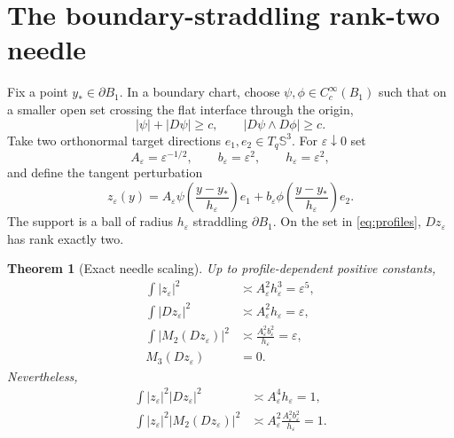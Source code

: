 \documentclass[10pt]{article}
\newtheorem{theorem}{Theorem}[section]
\newcommand{\SSS}{\mathbb S}
\begin{document}
\section{The boundary-straddling rank-two needle}

Fix a point $y_\ast\in\partial B_1$.  In a boundary chart, choose
$\psi,\phi\in C_c^\infty(B_1)$ such that on a smaller open set crossing the
flat interface through the origin,
\begin{equation}
 |\psi|+|D\psi|\geq c,\qquad |D\psi\wedge D\phi|\geq c. \label{eq:profiles}
\end{equation}
Take two orthonormal target directions $e_1,e_2\in T_q\SSS^3$.  For
$\varepsilon\downarrow0$ set
\begin{equation}
 A_\varepsilon=\varepsilon^{-1/2},\qquad
 b_\varepsilon=\varepsilon^2,\qquad
 h_\varepsilon=\varepsilon^2,                         \label{eq:scales}
\end{equation}
and define the tangent perturbation
\begin{equation}
 z_\varepsilon(y)=
 A_\varepsilon\psi\!\left(\frac{y-y_\ast}{h_\varepsilon}\right)e_1+
 b_\varepsilon\phi\!\left(\frac{y-y_\ast}{h_\varepsilon}\right)e_2 .
 \label{eq:needle}
\end{equation}
The support is a ball of radius $h_\varepsilon$ straddling
$\partial B_1$.  On the set in \eqref{eq:profiles}, $Dz_\varepsilon$ has
rank exactly two.

\begin{theorem}[Exact needle scaling]
Up to profile-dependent positive constants,
\begin{align}
 \int|z_\varepsilon|^2
 &\asymp A_\varepsilon^2h_\varepsilon^3
 =\varepsilon^5,                                      \label{eq:L2}\\
 \int|Dz_\varepsilon|^2
 &\asymp A_\varepsilon^2h_\varepsilon
 =\varepsilon,                                        \label{eq:E1}\\
 \int|M_2(Dz_\varepsilon)|^2
 &\asymp
 \frac{A_\varepsilon^2b_\varepsilon^2}{h_\varepsilon}
 =\varepsilon,                                        \label{eq:E2}\\
 M_3(Dz_\varepsilon)&=0.                              \label{eq:E3}
\end{align}
Nevertheless,
\begin{align}
 \int|z_\varepsilon|^2|Dz_\varepsilon|^2
 &\asymp A_\varepsilon^4h_\varepsilon=1,               \label{eq:weighted1}\\
 \int|z_\varepsilon|^2|M_2(Dz_\varepsilon)|^2
 &\asymp
 A_\varepsilon^2
 \frac{A_\varepsilon^2b_\varepsilon^2}{h_\varepsilon}
 =1.                                                   \label{eq:weighted2}
\end{align}
\end{theorem}
\end{document}
